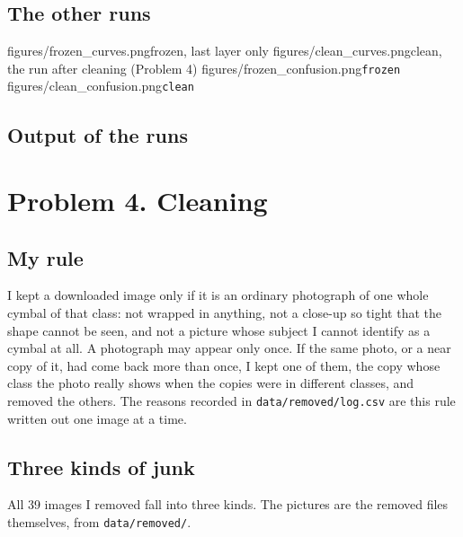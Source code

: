 \documentclass[11pt]{article}
\begin{document}
\subsection*{The other runs}
           {figures/frozen_curves.png}{frozen, last layer only}
           {figures/clean_curves.png}{clean, the run after cleaning (Problem 4)}
           {figures/frozen_confusion.png}{\texttt{frozen}}
           {figures/clean_confusion.png}{\texttt{clean}}

\subsection*{Output of the runs}

\section*{Problem 4. Cleaning}

\subsection*{My rule}

I kept a downloaded image only if it is an ordinary photograph of one whole
cymbal of that class: not wrapped in anything, not a close-up so tight that the
shape cannot be seen, and not a picture whose subject I cannot identify as a
cymbal at all. A photograph may appear only once. If the same photo, or a near
copy of it, had come back more than once, I kept one of them, the copy whose
class the photo really shows when the copies were in different classes, and
removed the others. The reasons recorded in \texttt{data/removed/log.csv} are
this rule written out one image at a time.

\subsection*{Three kinds of junk}

All 39 images I removed fall into three kinds. The pictures are the removed
files themselves, from \texttt{data/removed/}.
\end{document}
